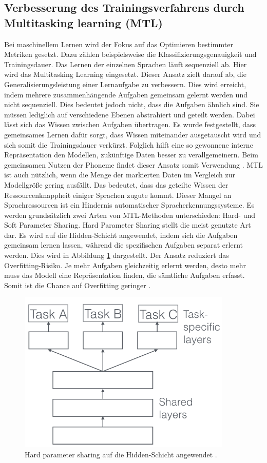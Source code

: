 \subsection{Verbesserung des Trainingsverfahrens durch Multitasking learning (MTL)}
 Bei maschinellem Lernen wird der Fokus auf das Optimieren bestimmter Metriken gesetzt. Dazu zählen beispielsweise die Klassifizierungsgenauigkeit und Trainingsdauer. Das Lernen der einzelnen Sprachen läuft sequenziell ab. Hier wird das Multitasking Learning eingesetzt. Dieser Ansatz zielt darauf ab, die Generalisierungsleistung einer Lernaufgabe zu verbessern. Dies wird erreicht, indem mehrere zusammenhängende Aufgaben gemeinsam gelernt werden und nicht sequenziell. Dies bedeutet jedoch nicht, dass die Aufgaben ähnlich sind. Sie müssen lediglich auf verschiedene Ebenen abstrahiert und geteilt werden. Dabei lässt sich das Wissen zwischen Aufgaben übertragen. Es wurde festgestellt, dass gemeinsames Lernen dafür sorgt, dass Wissen miteinander ausgetauscht wird und sich somit die Trainingsdauer verkürzt. Folglich hilft eine so gewonnene interne Repräsentation den Modellen, zukünftige Daten besser zu verallgemeinern. Beim gemeinsamen Nutzen der Phoneme findet dieser Ansatz somit Verwendung {\cite{multitask}}. MTL ist auch nützlich, wenn die Menge der markierten Daten im Vergleich zur Modellgröße gering ausfällt. Das bedeutet, dass das geteilte Wissen der Ressourcenknappheit einiger Sprachen zugute kommt. Dieser Mangel an Sprachressourcen ist ein Hindernis automatischer Spracherkennungssysteme. Es werden grundsätzlich zwei Arten von MTL-Methoden unterschieden: Hard- und Soft Parameter Sharing.\newline\newline
 Hard Parameter Sharing stellt die meist genutzte Art dar\cite{Ruder.2017}. Es wird auf die Hidden-Schicht angewendet, indem sich die Aufgaben gemeinsam lernen lassen, während die spezifischen Aufgaben separat erlernt werden. Dies wird in Abbildung \ref{fig:hard} dargestellt. Der Ansatz reduziert das Overfitting-Risiko. Je mehr Aufgaben gleichzeitig erlernt werden, desto mehr muss das Modell eine Repräsentation finden, die sämtliche Aufgaben erfasst. Somit ist die Chance auf Overfitting geringer \cite{Ruder.2017} \cite{Lu_multitasklearning}.
  \begin{figure}[h!]
 	\centering
 	\includegraphics[width=0.8\linewidth]{images/hard}
 	\caption{Hard parameter sharing auf die Hidden-Schicht angewendet \cite{Kulbear.2017}.} %
 	\label{fig:hard}
 \end{figure}


